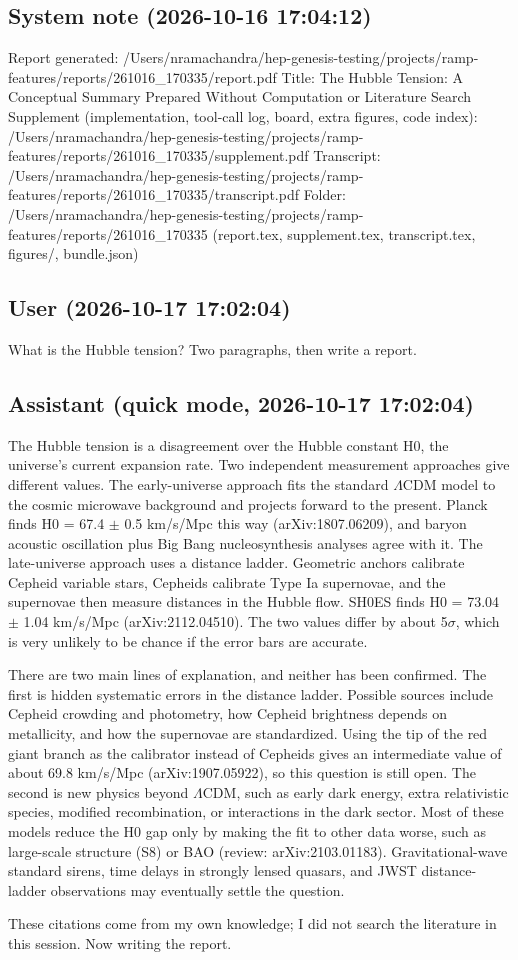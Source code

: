 \documentclass[11pt,a4paper]{article}
\begin{document}
\subsection*{System note \small(2026-10-16 17:04:12)}
Report generated: /Users/nramachandra/hep-genesis-testing/projects/ramp-features/reports/261016\_170335/report.pdf Title: The Hubble Tension: A Conceptual Summary Prepared Without Computation or Literature Search Supplement (implementation, tool-call log, board, extra figures, code index): /Users/nramachandra/hep-genesis-testing/projects/ramp-features/reports/261016\_170335/supplement.pdf Transcript: /Users/nramachandra/hep-genesis-testing/projects/ramp-features/reports/261016\_170335/transcript.pdf Folder: /Users/nramachandra/hep-genesis-testing/projects/ramp-features/reports/261016\_170335 (report.tex, supplement.tex, transcript.tex, figures/, bundle.json)

\subsection*{User \small(2026-10-17 17:02:04)}
What is the Hubble tension? Two paragraphs, then write a report.

\subsection*{Assistant \small(quick mode, 2026-10-17 17:02:04)}
The Hubble tension is a disagreement over the Hubble constant H0, the universe's current expansion rate. Two independent measurement approaches give different values. The early-universe approach fits the standard $\Lambda$CDM model to the cosmic microwave background and projects forward to the present. Planck finds H0 = 67.4 $\pm$ 0.5 km/s/Mpc this way (arXiv:1807.06209), and baryon acoustic oscillation plus Big Bang nucleosynthesis analyses agree with it. The late-universe approach uses a distance ladder. Geometric anchors calibrate Cepheid variable stars, Cepheids calibrate Type Ia supernovae, and the supernovae then measure distances in the Hubble flow. SH0ES finds H0 = 73.04 $\pm$ 1.04 km/s/Mpc (arXiv:2112.04510). The two values differ by about 5$\sigma$, which is very unlikely to be chance if the error bars are accurate.

There are two main lines of explanation, and neither has been confirmed. The first is hidden systematic errors in the distance ladder. Possible sources include Cepheid crowding and photometry, how Cepheid brightness depends on metallicity, and how the supernovae are standardized. Using the tip of the red giant branch as the calibrator instead of Cepheids gives an intermediate value of about 69.8 km/s/Mpc (arXiv:1907.05922), so this question is still open. The second is new physics beyond $\Lambda$CDM, such as early dark energy, extra relativistic species, modified recombination, or interactions in the dark sector. Most of these models reduce the H0 gap only by making the fit to other data worse, such as large-scale structure (S8) or BAO (review: arXiv:2103.01183). Gravitational-wave standard sirens, time delays in strongly lensed quasars, and JWST distance-ladder observations may eventually settle the question.

These citations come from my own knowledge; I did not search the literature in this session. Now writing the report.
\end{document}
